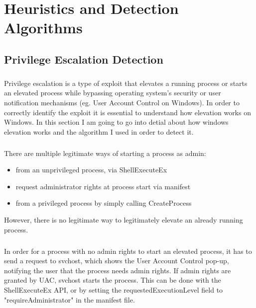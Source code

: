 \chapter{Heuristics and Detection Algorithms}
    \section{Privilege Escalation Detection}
        
        \paragraph{}
        Privilege escalation is a type of exploit that elevates a running process or starts an elevated process while bypassing operating system's
        security or user notification mechanisms (eg. User Account Control on Windows). In order to correctly identify the exploit it is essential
        to understand how elevation works on Windows. In this section I am going to go into detial about how windows elevation works and the
        algorithm I used in order to detect it.

        \paragraph{}
        There are multiple legitimate ways of starting a process as admin:
        \begin{itemize}
            \item from an unprivileged process, via ShellExecuteEx %
            \item request administrator rights at process start via manifest
            \item from a privileged process by simply calling CreateProcess
        \end{itemize}
        However, there is no legitimate way to legitimately elevate an already running process.

        \paragraph{}
        In order for a process with no admin rights to start an elevated process, it has to send a request to svchost, which shows the User Account
        Control pop-up, notifying the user that the process needs admin rights. If admin rights are granted by UAC, svchost starts the process.
        This can be done with the ShellExecuteEx API, or by setting the requestedExecutionLevel field to "requireAdministrator" in the manifest
        file.

